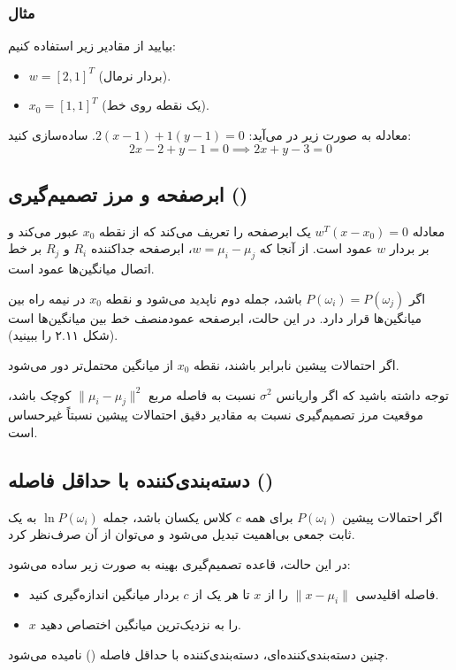 \documentclass{article}
\begin{document}
\subsubsection*{مثال}
بیایید از مقادیر زیر استفاده کنیم:
\begin{itemize}
    \item $w = [2, 1]^T$ (بردار نرمال).
    \item $x_0 = [1, 1]^T$ (یک نقطه روی خط).
\end{itemize}
معادله به صورت زیر در می‌آید: $2(x-1) + 1(y-1) = 0$. ساده‌سازی کنید:
\[
2x-2+y-1=0 \implies 2x+y-3=0
\]

\subsection*{ابرصفحه و مرز تصمیم‌گیری ()}
معادله $w^T(x-x_0) = 0$ یک ابرصفحه را تعریف می‌کند که از نقطه $x_0$ عبور می‌کند و بر بردار $w$ عمود است. از آنجا که $w = \mu_i - \mu_j$، ابرصفحه جداکننده $R_i$ و $R_j$ بر خط اتصال میانگین‌ها عمود است.

اگر $P(\omega_i) = P(\omega_j)$ باشد، جمله دوم ناپدید می‌شود و نقطه $x_0$ در نیمه راه بین میانگین‌ها قرار دارد. در این حالت، ابرصفحه عمودمنصف خط بین میانگین‌ها است (شکل ۲.۱۱ را ببینید).

اگر احتمالات پیشین نابرابر باشند، نقطه $x_0$ از میانگین محتمل‌تر دور می‌شود.

توجه داشته باشید که اگر واریانس $\sigma^2$ نسبت به فاصله مربع $\|\mu_i - \mu_j\|^2$ کوچک باشد، موقعیت مرز تصمیم‌گیری نسبت به مقادیر دقیق احتمالات پیشین نسبتاً غیرحساس است.

\subsection*{دسته‌بندی‌کننده با حداقل فاصله ()}
اگر احتمالات پیشین $P(\omega_i)$ برای همه $c$ کلاس یکسان باشد، جمله $\ln P(\omega_i)$ به یک ثابت جمعی بی‌اهمیت تبدیل می‌شود و می‌توان از آن صرف‌نظر کرد.

در این حالت، قاعده تصمیم‌گیری بهینه به صورت زیر ساده می‌شود:
\begin{itemize}
    \item فاصله اقلیدسی $\|x - \mu_i\|$ را از $x$ تا هر یک از $c$ بردار میانگین اندازه‌گیری کنید.
    \item $x$ را به نزدیک‌ترین میانگین اختصاص دهید.
\end{itemize}

چنین دسته‌بندی‌کننده‌ای، دسته‌بندی‌کننده با حداقل فاصله () نامیده می‌شود.
\end{document}
